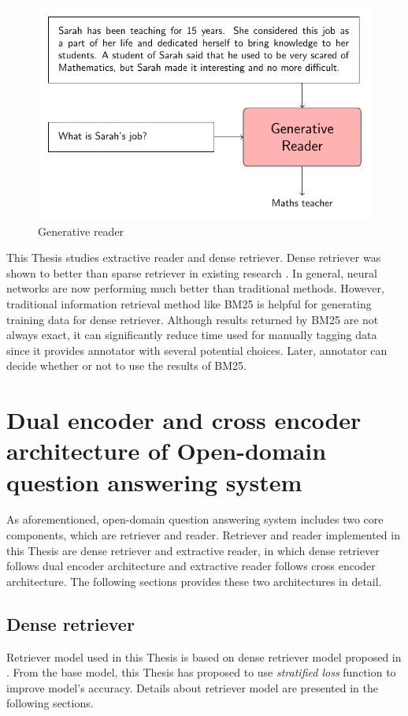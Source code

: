 \documentclass[12pt, sort&compress]{report}
\begin{document}
\begin{figure}
	\centering
	\includegraphics[scale=1.0]{images/PDF/generative_reader/generative_reader.pdf}
	\caption{Generative reader}
	\label{fig:03}
\end{figure}
This Thesis studies extractive reader and dense retriever. Dense retriever was shown to better than sparse retriever in existing research \cite{karpukhin2020dense}. In general, neural networks are now performing much better than traditional methods. However, traditional information retrieval method like BM25 is helpful for generating training data for dense retriever. %
Although results returned by BM25 are not always exact, it can significantly reduce time used for manually tagging data since it provides annotator with several potential choices. Later, annotator can decide whether or not to use the results of BM25.
\section{Dual encoder and cross encoder architecture of Open-domain question answering system}
As aforementioned, open-domain question answering system includes two core components, which are retriever and reader. Retriever and reader implemented in this Thesis are dense retriever and extractive reader, in which dense retriever follows dual encoder architecture and extractive reader follows cross encoder architecture. The following sections provides these two architectures in detail.
\subsection{Dense retriever}
Retriever model used in this Thesis is based on dense retriever model proposed in \cite{karpukhin2020dense}. From the base model, this Thesis has proposed to use \textit{stratified loss} function to improve model's accuracy. Details about retriever model are presented in the following sections.
\end{document}
